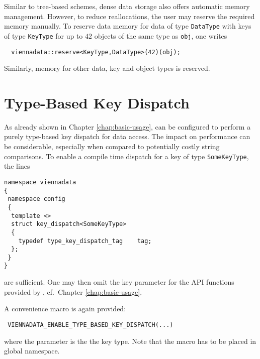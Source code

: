 Similar to tree-based schemes, dense data storage also offers automatic memory management. However, to reduce reallocations,
the user may reserve the required memory manually.
To reserve data memory for data of type \lstinline|DataType| with keys of type \lstinline|KeyType| for up to $42$ objects of the same type as \lstinline|obj|,
one writes
\begin{lstlisting}
  viennadata::reserve<KeyType,DataType>(42)(obj);
\end{lstlisting}
Similarly, memory for other data, key and object types is reserved.


\section{Type-Based Key Dispatch} \label{sec:compiletime-keys}
As already shown in Chapter \ref{chap:basic-usage}, {\ViennaData} can be configured to perform a purely type-based key dispatch for data access.
The impact on performance can be considerable, especially when compared to potentially costly string comparisons.
To enable a compile time dispatch for a key of type \lstinline|SomeKeyType|, the lines
\begin{lstlisting}
namespace viennadata
{
 namespace config
 {
  template <>
  struct key_dispatch<SomeKeyType>
  {
    typedef type_key_dispatch_tag    tag;
  };
 }
}
\end{lstlisting}
are sufficient. One may then omit the key parameter for the API functions provided by {\ViennaData}, cf.~Chapter \ref{chap:basic-usage}.

A convenience macro is again provided:
\begin{lstlisting}
 VIENNADATA_ENABLE_TYPE_BASED_KEY_DISPATCH(...)
\end{lstlisting}
where the parameter is the the key type. Note that the macro has to be placed in global namespace.



